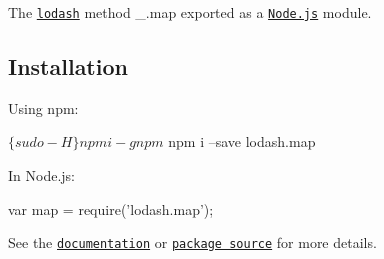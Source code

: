 The \href{https://lodash.com/}{\tt lodash} method {\ttfamily \+\_\+.\+map} exported as a \href{https://nodejs.org/}{\tt Node.\+js} module.

\subsection*{Installation}

Using npm\+: 
\begin{DoxyCode}
$ \{sudo -H\} npm i -g npm
$ npm i --save lodash.map
\end{DoxyCode}


In Node.\+js\+: 
\begin{DoxyCode}
var map = require('lodash.map');
\end{DoxyCode}


See the \href{https://lodash.com/docs#map}{\tt documentation} or \href{https://github.com/lodash/lodash/blob/4.6.0-npm-packages/lodash.map}{\tt package source} for more details. 